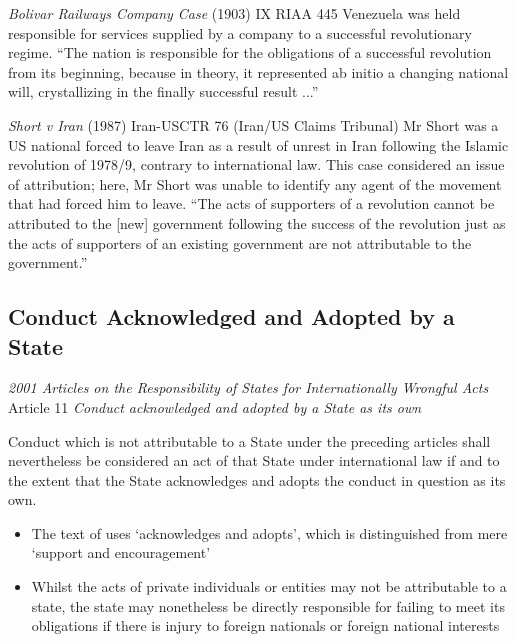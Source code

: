 \begin{casedetails}{\textit{Bolivar Railways Company Case} (1903) IX RIAA 445}
    \flushleft
    Venezuela was held responsible for services supplied by a company to a successful revolutionary regime. ``The nation is responsible for the obligations of a successful revolution from its beginning, because in theory, it represented ab initio a changing national will, crystallizing in the finally successful result ...''
\end{casedetails}

\begin{casedetails}{\textit{Short v Iran} (1987) Iran-USCTR 76 (Iran/US Claims Tribunal)}
    \flushleft
    Mr Short was a US national forced to leave Iran as a result of unrest in Iran following the Islamic revolution of 1978/9, contrary to international law. This case considered an issue of attribution; here, Mr Short was unable to identify any agent of the movement that had forced him to leave. ``The acts of supporters of a revolution cannot be attributed to the [new] government following the success of the revolution just as the acts of supporters of an existing government are not attributable to the government.''
\end{casedetails}

\subsection{Conduct Acknowledged and Adopted by a State}

\begin{conventiondetails}{\textit{2001 Articles on the Responsibility of States for Internationally Wrongful Acts} Article 11}
    \flushleft
    \textit{Conduct acknowledged and adopted by a State as its own}

    \vspace{\baselineskip}

    Conduct which is not attributable to a State under the preceding articles shall nevertheless be considered an act of that State under international law if and to the extent that the State acknowledges and adopts the conduct in question as its own.
\end{conventiondetails}

\begin{itemize}
    \item The text of  uses `acknowledges and adopts', which is distinguished from mere `support and encouragement'
    \item Whilst the acts of private individuals or entities may not be attributable to a state, the state may nonetheless be directly responsible for failing to meet its obligations if there is injury to foreign nationals or foreign national interests
\end{itemize}

